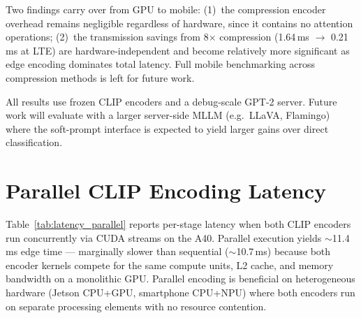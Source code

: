 Two findings carry over from GPU to mobile: (1)~the compression encoder overhead remains negligible regardless of hardware, since it contains no attention operations; (2)~the transmission savings from 8$\times$ compression (1.64\,ms $\to$ 0.21\,ms at LTE) are hardware-independent and become relatively more significant as edge encoding dominates total latency. Full mobile benchmarking across compression methods is left for future work.

All results use frozen CLIP encoders and a debug-scale GPT-2 server. Future work will evaluate with a larger server-side MLLM (e.g.\ LLaVA, Flamingo) where the soft-prompt interface is expected to yield larger gains over direct classification.

\appendix

\section{Parallel CLIP Encoding Latency}
\label{app:parallel}

Table~\ref{tab:latency_parallel} reports per-stage latency when both CLIP encoders run concurrently via CUDA streams on the A40. Parallel execution yields $\sim$11.4\,ms edge time — marginally slower than sequential ($\sim$10.7\,ms) because both encoder kernels compete for the same compute units, L2 cache, and memory bandwidth on a monolithic GPU. Parallel encoding is beneficial on heterogeneous hardware (Jetson CPU+GPU, smartphone CPU+NPU) where both encoders run on separate processing elements with no resource contention.

